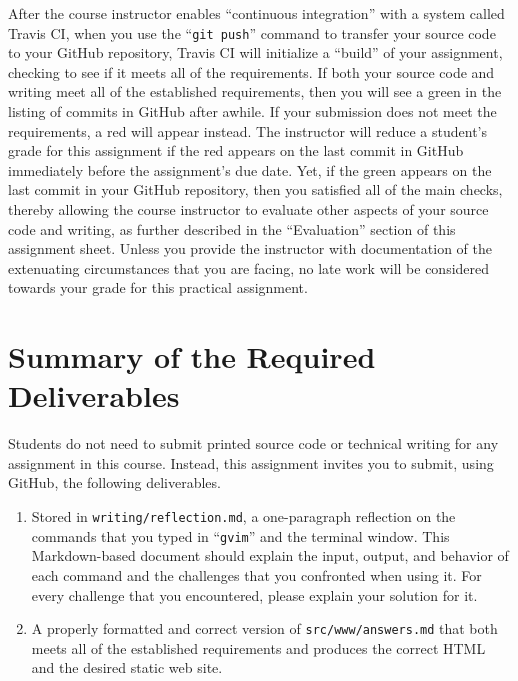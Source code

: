 \documentclass[11pt]{article}
\newcommand{\mainprogramsource}{\lstinline{src/www/answers.md}}
\newcommand{\reflection}{\lstinline{writing/reflection.md}}
\newcommand{\gitpush}{\command{git push}}
\newcommand{\command}[1]{``\lstinline{#1}''}
\newcommand{\step}[1]{``{#1}''}
\newcommand{\checkmark}{\ding{51}}
\newcommand{\naughtmark}{\ding{55}}
\begin{document}
After the course instructor enables \step{continuous integration} with a system called Travis CI, when you use the
\gitpush{} command to transfer your source code to your GitHub repository, Travis CI will initialize a \step{build} of
your assignment, checking to see if it meets all of the requirements. If both your source code and writing meet all of
the established requirements, then you will see a green \checkmark{} in the listing of commits in GitHub after awhile.
If your submission does not meet the requirements, a red \naughtmark{} will appear instead. The instructor will reduce a
student's grade for this assignment if the red \naughtmark{} appears on the last commit in GitHub immediately before the
assignment's due date. Yet, if the green \checkmark{} appears on the last commit in your GitHub repository, then you
satisfied all of the main checks, thereby allowing the course instructor to evaluate other aspects of your source code
and writing, as further described in the \step{Evaluation} section of this assignment sheet. Unless you provide the
instructor with documentation of the extenuating circumstances that you are facing, no late work will be considered
towards your grade for this practical assignment.

\section*{Summary of the Required Deliverables}

\noindent Students do not need to submit printed source code or technical writing for any assignment in this course.
Instead, this assignment invites you to submit, using GitHub, the following deliverables.

\begin{enumerate}

\setlength{\itemsep}{0in}

\item Stored in \reflection{}, a one-paragraph reflection on the commands that you typed in \command{gvim} and the
  terminal window. This Markdown-based document should explain the input, output, and behavior of each command and the
  challenges that you confronted when using it. For every challenge that you encountered, please explain your solution
  for it.

\item A properly formatted and correct version of \mainprogramsource{} that both meets all of the established
  requirements and produces the correct HTML and the desired static web site.

\end{enumerate}
\end{document}
